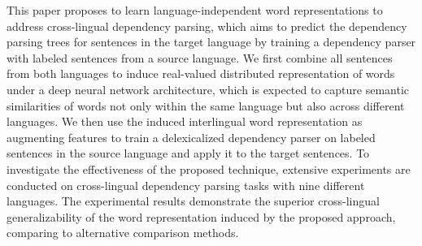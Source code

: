 This paper proposes to learn language-independent word representations to address cross-lingual dependency parsing, which aims to predict the dependency parsing trees for sentences in the target language by training a dependency parser with labeled sentences from a source language. We first combine all sentences from both languages to induce real-valued distributed representation of words under a deep neural network architecture, which is expected to capture semantic similarities of words not only within the same language but also across different languages. We then use the induced interlingual word representation as augmenting features to train a delexicalized dependency parser on labeled sentences in the source language and apply it to the target sentences. To investigate the effectiveness of the proposed technique, extensive experiments are conducted on cross-lingual dependency parsing tasks with nine different languages. The experimental results demonstrate the superior cross-lingual generalizability of the word representation induced by the proposed approach, comparing to alternative comparison methods.
